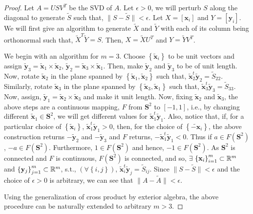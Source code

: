 \begin{proof}
  Let $A=USV^T$ be the SVD of $A$. Let $\epsilon > 0$, we will perturb $S$ along the diagonal to generate $\widetilde{S}$ such that, $\|S - \widetilde{S}\| < \epsilon$. Let $X=\left[\mathbf{x}_i\right]$ and $Y=\left[\mathbf{y}_i\right]$. We will first give an algorithm to generate $\widetilde{X}$ and $\widetilde{Y}$ with each
  of its column being orthonormal such that, $\widetilde{X}^T\widetilde{Y}=S$. Then, $X=\widetilde{X}U^T$ and $Y=\widetilde{Y}V^T$. 

We begin with an algorithm for $m=3$. Choose $\left\{\widetilde{\mathbf{x}}_i\right\}$ to be unit vectors and assign $\widetilde{\mathbf{y}}_3=\widetilde{\mathbf{x}}_1\times \widetilde{\mathbf{x}}_2$, $\widetilde{\mathbf{y}}_2=\widetilde{\mathbf{x}}_3\times \widetilde{\mathbf{x}}_1$. Then, make $\widetilde{\mathbf{y}}_2$ and $\widetilde{\mathbf{y}}_3$ to be of unit length. %
Now, rotate $\widetilde{\mathbf{x}}_2$ in the plane spanned by $\left\{\widetilde{\mathbf{x}}_1, \widetilde{\mathbf{x}}_2\right\}$ such that,
$\widetilde{\mathbf{x}}_2^t\widetilde{\mathbf{y}}_2=\widetilde{S}_{22}$. Similarly, rotate $\widetilde{\mathbf{x}}_3$ in the plane spanned by $\left\{\widetilde{\mathbf{x}}_3, \widetilde{\mathbf{x}}_1\right\}$ such that,
$\widetilde{\mathbf{x}}_3^t\widetilde{\mathbf{y}}_3=\widetilde{S}_{33}$. Now, assign, $\widetilde{\mathbf{y}}_1=\widetilde{\mathbf{x}}_2\times \widetilde{\mathbf{x}}_3$ and make it unit length. Now, fixing $\widetilde{\mathbf{x}}_2$ and $\widetilde{\mathbf{x}}_3$, the above steps are a continuous mapping, $F$ from $\mathbf{S}^2$ to $[-1,1]$, i.e., by changing different $\widetilde{\mathbf{x}}_1 \in \mathbf{S}^2$, we will get different values for $\widetilde{\mathbf{x}}_1^t\widetilde{\mathbf{y}}_1$. Also, notice that, if, for a particular choice of $\left\{\widetilde{\mathbf{x}}_i\right\}$, $\widetilde{\mathbf{x}}_1^t\widetilde{\mathbf{y}}_1>0$, then, for the choice of $\left\{\widetilde{-\mathbf{x}}_i\right\}$, the above construction returns $-\widetilde{\mathbf{y}}_2$ and $-\widetilde{\mathbf{y}}_3$ and $F$ returns, $-\widetilde{\mathbf{x}}_1^t\widetilde{\mathbf{y}}_1<0$. Thus if $a \in F\left(\mathbf{S}^2\right)$,  $-a \in F\left(\mathbf{S}^2\right)$. Furthermore, $1\in F\left(\mathbf{S}^2\right)$ and hence, $-1\in F\left(\mathbf{S}^2\right)$. As $\mathbf{S}^2$ is connected and $F$ is continuous,
$F\left(\mathbf{S}^2\right)$ is connected, and so, $\exists$ $\left\{\mathbf{x}_i\right\}_{i=1}^m\subset \mathbb{R}^m$ and $\left\{\mathbf{y}_j\right\}_{j=1}^m\subset \mathbb{R}^m$, s.t., $\left(\forall \left\{i, j\right\}\right)$, 
$\widetilde{\mathbf{x}}_i^t\widetilde{\mathbf{y}}_j = \widetilde{S}_{ij}$. Since $\|S-\widetilde{S}\|< \epsilon$ and the
choice of $\epsilon> 0$ is arbitrary, we can see that $\|A - \widetilde{A}\| < \epsilon$.

Using the generalization of cross product by exterior algebra, the above procedure can be naturally extended to arbitrary $m>3$.
\end{proof}

